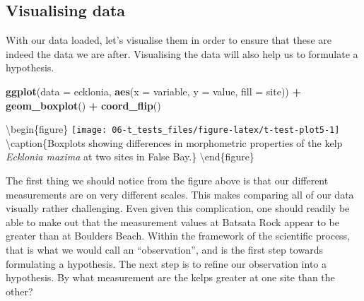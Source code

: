 \documentclass[english,10pt,a4paper,oneside]{book}
\newenvironment{Shaded}{\begin{snugshade}}{\end{snugshade}}
\newcommand{\DataTypeTok}[1]{\textcolor[rgb]{0.13,0.29,0.53}{#1}}
\newcommand{\KeywordTok}[1]{\textcolor[rgb]{0.13,0.29,0.53}{\textbf{#1}}}
\newcommand{\NormalTok}[1]{#1}
\newcommand{\OperatorTok}[1]{\textcolor[rgb]{0.81,0.36,0.00}{\textbf{#1}}}
\newcommand{\StringTok}[1]{\textcolor[rgb]{0.31,0.60,0.02}{#1}}
\theoremstyle{definition}
\theoremstyle{definition}
\theoremstyle{definition}
\theoremstyle{remark}
\begin{document}
\begin{Shaded}
\end{Shaded}

\hypertarget{visualising-data}{%
\subsection{Visualising data}\label{visualising-data}}

With our data loaded, let's visualise them in order to ensure that these
are indeed the data we are after. Visualising the data will also help us
to formulate a hypothesis.

\begin{Shaded}
\begin{Highlighting}[]
\KeywordTok{ggplot}\NormalTok{(}\DataTypeTok{data =}\NormalTok{ ecklonia, }\KeywordTok{aes}\NormalTok{(}\DataTypeTok{x =}\NormalTok{ variable, }\DataTypeTok{y =}\NormalTok{ value, }\DataTypeTok{fill =}\NormalTok{ site)) }\OperatorTok{+}
\StringTok{  }\KeywordTok{geom_boxplot}\NormalTok{() }\OperatorTok{+}
\StringTok{  }\KeywordTok{coord_flip}\NormalTok{()}
\end{Highlighting}
\end{Shaded}

\textbackslash{}begin\{figure\}
\texttt{[image: 06-t\_tests\_files/figure-latex/t-test-plot5-1]}
\textbackslash{}caption\{Boxplots showing differences in morphometric
properties of the kelp \emph{Ecklonia maxima} at two sites in False
Bay.\}\label{fig:t-test-plot5} \textbackslash{}end\{figure\}

The first thing we should notice from the figure above is that our
different measurements are on very different scales. This makes
comparing all of our data visually rather challenging. Even given this
complication, one should readily be able to make out that the
measurement values at Batsata Rock appear to be greater than at Boulders
Beach. Within the framework of the scientific process, that is what we
would call an \enquote{observation}, and is the first step towards
formulating a hypothesis. The next step is to refine our observation
into a hypothesis. By what measurement are the kelps greater at one site
than the other?
\end{document}

